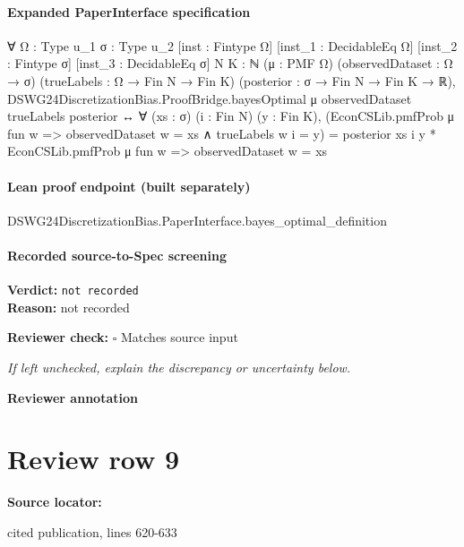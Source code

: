 \documentclass[10pt]{article}
\newcommand{\reviewerbox}{%
  \par\noindent\fbox{\parbox{0.96\linewidth}{\rule{0pt}{0.38in}}}\par
}
\newcommand{\reviewmatch}[1]{%
  \par\noindent\textbf{Reviewer check:} $\square$\; #1\par
  \noindent\emph{If left unchecked, explain the discrepancy or uncertainty below.}\par
}
\begin{document}
\paragraph{Expanded PaperInterface specification}
\begin{ReviewVerbatim}
∀ {Ω : Type u_1} {σ : Type u_2} [inst : Fintype Ω] [inst_1 : DecidableEq Ω] [inst_2 : Fintype σ]
  [inst_3 : DecidableEq σ] {N K : ℕ} (μ : PMF Ω) (observedDataset : Ω → σ) (trueLabels : Ω → Fin N → Fin K)
  (posterior : σ → Fin N → Fin K → ℝ),
  DSWG24DiscretizationBias.ProofBridge.bayesOptimal μ observedDataset trueLabels posterior ↔
    ∀ (xs : σ) (i : Fin N) (y : Fin K),
      (EconCSLib.pmfProb μ fun w => observedDataset w = xs ∧ trueLabels w i = y) =
        posterior xs i y * EconCSLib.pmfProb μ fun w => observedDataset w = xs
\end{ReviewVerbatim}

\paragraph{Lean proof endpoint (built separately)}\begin{ReviewVerbatim}
DSWG24DiscretizationBias.PaperInterface.bayes_optimal_definition
\end{ReviewVerbatim}

\paragraph{Recorded source-to-Spec screening}
\textbf{Verdict:} \texttt{not recorded}
\\
\textbf{Reason:} not recorded
\reviewmatch{Matches source input}
\noindent\textbf{Reviewer annotation}\par
\reviewerbox
\clearpage
\hypertarget{source-claim-7d95c2576dd31d3f}{}
\section*{Review row 9}
\textbf{Source locator:} {\footnotesize\raggedright cited publication, lines 620-\allowbreak{}633\par}
\end{document}
